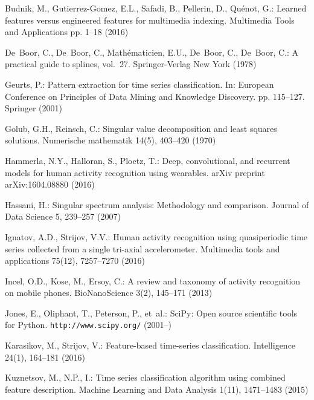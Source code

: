 \documentclass{llncs}
\begin{document}
\begin{thebibliography}{10}
	\providecommand{\url}[1]{\texttt{#1}}
	\providecommand{\urlprefix}{URL }
	
	Budnik, M., Gutierrez-Gomez, E.L., Safadi, B., Pellerin, D., Qu{\'e}not, G.:
	Learned features versus engineered features for multimedia indexing.
	Multimedia Tools and Applications pp. 1--18 (2016)
	
	De~Boor, C., De~Boor, C., Math{\'e}maticien, E.U., De~Boor, C., De~Boor, C.: A
	practical guide to splines, vol.~27. Springer-Verlag New York (1978)
	
	Geurts, P.: Pattern extraction for time series classification. In: European
	Conference on Principles of Data Mining and Knowledge Discovery. pp.
	115--127. Springer (2001)
	
	Golub, G.H., Reinsch, C.: Singular value decomposition and least squares
	solutions. Numerische mathematik  14(5),  403--420 (1970)
	
	Hammerla, N.Y., Halloran, S., Ploetz, T.: Deep, convolutional, and recurrent
	models for human activity recognition using wearables. arXiv preprint
	arXiv:1604.08880  (2016)
	
	Hassani, H.: Singular spectrum analysis: Methodology and comparison. Journal of
	Data Science  5,  239--257 (2007)
	
	Ignatov, A.D., Strijov, V.V.: Human activity recognition using quasiperiodic
	time series collected from a single tri-axial accelerometer. Multimedia tools
	and applications  75(12),  7257--7270 (2016)
	
	Incel, O.D., Kose, M., Ersoy, C.: A review and taxonomy of activity recognition
	on mobile phones. BioNanoScience  3(2),  145--171 (2013)
	
	Jones, E., Oliphant, T., Peterson, P., et~al.: {SciPy}: Open source scientific
	tools for {Python}. \url{http://www.scipy.org/} (2001--)
	
	Karasikov, M., Strijov, V.: Feature-based time-series classification.
	Intelligence  24(1),  164--181 (2016)
	
	Kuznetsov, M., N.P., I.: Time series classification algorithm using combined
	feature description. Machine Learning and Data Analysis  1(11),  1471--1483
	(2015)
	

\end{thebibliography}
\end{document}
